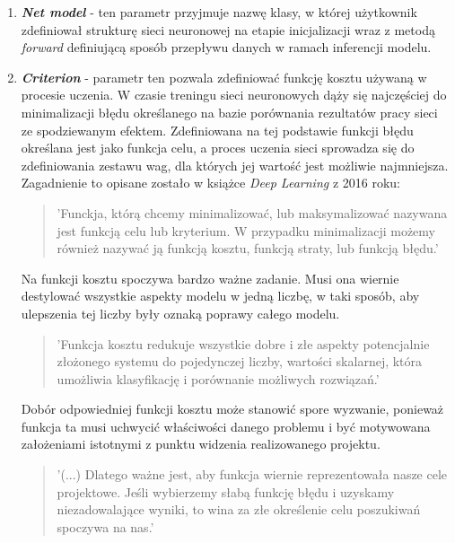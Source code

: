    \begin{enumerate}
    \item \textbf{\textit{Net model}} - ten parametr przyjmuje nazwę klasy, w której użytkownik
    zdefiniował strukturę sieci neuronowej na etapie inicjalizacji wraz z metodą
    \textit{forward} definiującą sposób przepływu danych w ramach inferencji modelu.
    \item \textbf{\textit{Criterion}} - parametr ten pozwala zdefiniować funkcję kosztu
    używaną w procesie uczenia. W czasie treningu sieci neuronowych dąży się
    najczęściej do minimalizacji błędu określanego na bazie porównania rezultatów
    pracy sieci ze spodziewanym efektem. Zdefiniowana na tej podstawie funkcji błędu
    określana jest jako funkcja celu, a proces uczenia sieci sprowadza się do zdefiniowania
    zestawu wag, dla których jej wartość jest możliwie najmniejsza. Zagadnienie
    to opisane zostało w książce \textit{Deep Learning} \cite{deeplearn} z 2016 roku:

    \begin{quote}
      'Funckja, którą chcemy minimalizować, lub maksymalizować nazywana jest funkcją celu lub kryterium.
      W przypadku minimalizacji możemy również nazywać ją funkcją kosztu, funkcją straty, lub funkcją błędu.'
    \end{quote}

    Na funkcji kosztu spoczywa bardzo ważne zadanie. Musi ona wiernie destylować wszystkie
    aspekty modelu w jedną liczbę, w taki sposób, aby ulepszenia tej liczby były
    oznaką poprawy całego modelu. \cite{neuralsmithing}

    \begin{quote}
      'Funkcja kosztu redukuje wszystkie dobre i złe aspekty potencjalnie złożonego
      systemu do pojedynczej liczby, wartości skalarnej, która umożliwia
      klasyfikację i porównanie możliwych rozwiązań.'
    \end{quote}

    Dobór odpowiedniej funkcji kosztu może stanowić spore wyzwanie, ponieważ funkcja
    ta musi uchwycić właściwości danego problemu i być motywowana założeniami
    istotnymi z punktu widzenia realizowanego projektu. \cite{neuralsmithing}

    \begin{quote}
      '(...) Dlatego ważne jest, aby funkcja wiernie reprezentowała nasze cele projektowe.
      Jeśli wybierzemy słabą funkcję błędu i uzyskamy niezadowalające wyniki, to
      wina za złe określenie celu poszukiwań spoczywa na nas.'
    \end{quote}


\end{enumerate}
